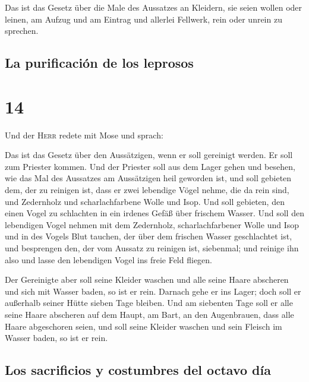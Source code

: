  Das ist das Gesetz über die Male des Aussatzes an
Kleidern, sie seien wollen oder leinen, am Aufzug und am Eintrag und
allerlei Fellwerk, rein oder unrein zu sprechen.

\hypertarget{la-purificaciuxf3n-de-los-leprosos}{%
\subsection{La purificación de los
leprosos}\label{la-purificaciuxf3n-de-los-leprosos}}

\hypertarget{section-13}{%
\section{14}\label{section-13}}

 Und der \textsc{Herr} redete mit Mose und sprach:

 Das ist das Gesetz über den Aussätzigen, wenn er soll
gereinigt werden. Er soll zum Priester kommen.  Und der
Priester soll aus dem Lager gehen und besehen, wie das Mal des Aussatzes
am Aussätzigen heil geworden ist,  und soll gebieten dem,
der zu reinigen ist, dass er zwei lebendige Vögel nehme, die da rein
sind, und Zedernholz und scharlachfarbene Wolle und Isop. 
Und soll gebieten, den einen Vogel zu schlachten in ein irdenes Gefäß
über frischem Wasser.  Und soll den lebendigen Vogel
nehmen mit dem Zedernholz, scharlachfarbener Wolle und Isop und in des
Vogels Blut tauchen, der über dem frischen Wasser geschlachtet ist,
 und besprengen den, der vom Aussatz zu reinigen ist,
siebenmal; und reinige ihn also und lasse den lebendigen Vogel ins freie
Feld fliegen.

 Der Gereinigte aber soll seine Kleider waschen und alle
seine Haare abscheren und sich mit Wasser baden, so ist er rein. Darnach
gehe er ins Lager; doch soll er außerhalb seiner Hütte sieben Tage
bleiben.  Und am siebenten Tage soll er alle seine Haare
abscheren auf dem Haupt, am Bart, an den Augenbrauen, dass alle Haare
abgeschoren seien, und soll seine Kleider waschen und sein Fleisch im
Wasser baden, so ist er rein.

\hypertarget{los-sacrificios-y-costumbres-del-octavo-duxeda}{%
\subsection{Los sacrificios y costumbres del octavo
día}\label{los-sacrificios-y-costumbres-del-octavo-duxeda}}

